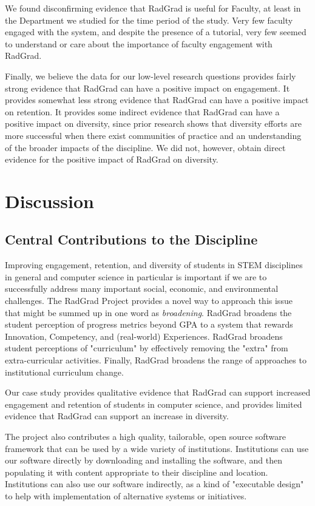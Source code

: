 \documentclass[acmsmall]{acmart}
\begin{document}
We found disconfirming evidence that RadGrad is useful for Faculty, at least in the Department we studied for the time period of the study. Very few faculty engaged with the system, and despite the presence of a tutorial, very few seemed to understand or care about the importance of faculty engagement with RadGrad.

Finally, we believe the data for our low-level research questions provides fairly strong evidence that RadGrad can have a positive impact on engagement.  It provides somewhat less strong evidence that RadGrad can have a positive impact on retention.  It provides some indirect evidence that RadGrad can have a positive impact on diversity, since prior research shows that diversity efforts are more successful when there exist communities of practice and an understanding of the broader impacts of the discipline. We did not, however, obtain direct evidence for the positive impact of RadGrad on diversity.

\section{Discussion}

\subsection{Central Contributions to the Discipline}

Improving engagement, retention, and diversity of students in STEM disciplines in general and computer science in particular is important if we are to successfully address many important social, economic, and environmental challenges. The RadGrad Project provides a novel way to approach this issue that might be summed up in one word as {\em broadening}.  RadGrad broadens the student perception of progress metrics beyond GPA to a system that rewards Innovation, Competency, and (real-world) Experiences.  RadGrad broadens student perceptions of "curriculum" by effectively removing the "extra" from extra-curricular activities.  Finally, RadGrad broadens the range of approaches to institutional curriculum change.

Our case study provides qualitative evidence that RadGrad can support increased engagement and retention of students in computer science, and provides limited evidence that RadGrad can support an increase in diversity.

The project also contributes a high quality, tailorable, open source software framework that can be used by a wide variety of institutions. Institutions can use our software directly by downloading and installing the software, and then populating it with content appropriate to their discipline and location.  Institutions can also use our software indirectly, as a kind of "executable design" to help with implementation of alternative systems or initiatives.
\end{document}
